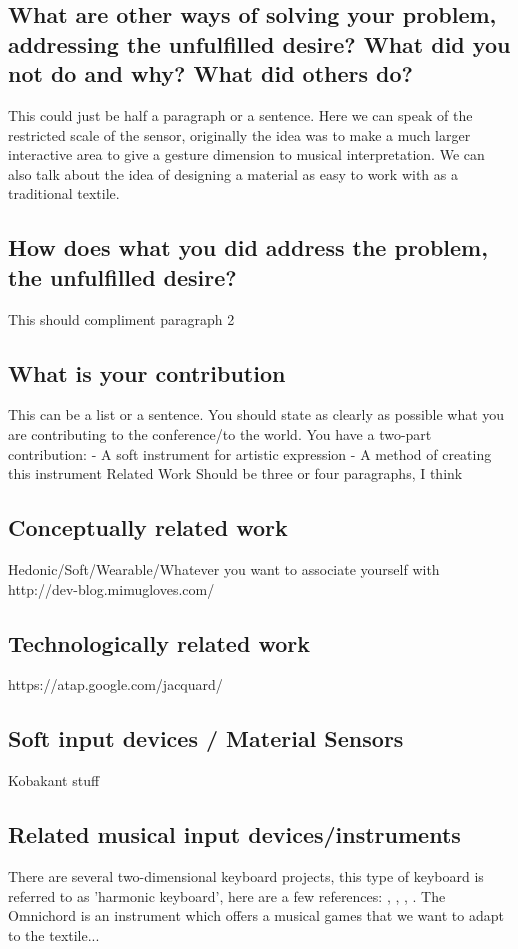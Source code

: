 \documentclass{sigchi-ext}
\begin{document}
\subsection{What are other ways of solving your problem, addressing the unfulfilled desire? What did you not do and why? What did others do?}


This could just be half a paragraph or a sentence.
Here we can speak of the restricted scale of the sensor, originally the idea was to make a much larger interactive area to give a gesture dimension to musical interpretation.
We can also talk about the idea of designing a material as easy to work with as a traditional textile.


\subsection{How does what you did address the problem, the unfulfilled desire?}
This should compliment paragraph 2


\subsection{What is your contribution}
This can be a list or a sentence. You should state as clearly as possible what you are contributing to the conference/to the world. You have a two-part contribution:
- A soft instrument for artistic expression
- A method of creating this instrument
Related Work
Should be three or four paragraphs, I think


\subsection{Conceptually related work}
Hedonic/Soft/Wearable/Whatever you want to associate yourself with
http://dev-blog.mimugloves.com/


\subsection{Technologically related work}
https://atap.google.com/jacquard/


\subsection{Soft input devices / Material Sensors}
Kobakant stuff


\subsection{Related musical input devices/instruments}
There are several two-dimensional keyboard projects, this type of keyboard is referred to as 'harmonic keyboard', here are a few references: \cite{lambdoma}, \cite{seaboard}, \cite{linnstrument}, \cite{omnichord}.
The Omnichord is an instrument which offers a musical games that we want to adapt to the textile...
\end{document}
